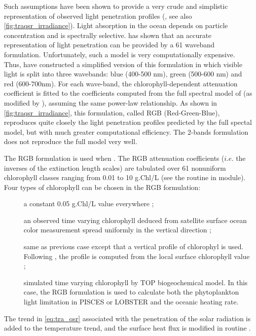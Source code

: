 \documentclass[../tex_main/NEMO_manual]{subfiles}
\begin{document}
Such assumptions have been shown to provide a very crude and simplistic 
representation of observed light penetration profiles (\cite{Morel_JGR88}, see also 
\autoref{fig:traqsr_irradiance}). Light absorption in the ocean depends on 
particle concentration and is spectrally selective. \cite{Morel_JGR88} has shown 
that an accurate representation of light penetration can be provided by a 61 waveband 
formulation. Unfortunately, such a model is very computationally expensive. 
Thus, \cite{Lengaigne_al_CD07} have constructed a simplified version of this 
formulation in which visible light is split into three wavebands: blue (400-500 nm), 
green (500-600 nm) and red (600-700nm). For each wave-band, the chlorophyll-dependent 
attenuation coefficient is fitted to the coefficients computed from the full spectral model 
of \cite{Morel_JGR88} (as modified by \cite{Morel_Maritorena_JGR01}), assuming 
the same power-law relationship. As shown in \autoref{fig:traqsr_irradiance}, 
this formulation, called RGB (Red-Green-Blue), reproduces quite closely 
the light penetration profiles predicted by the full spectal model, but with much greater 
computational efficiency. The 2-bands formulation does not reproduce the full model very well. 

The RGB formulation is used when . The RGB attenuation coefficients
($i.e.$ the inverses of the extinction length scales) are tabulated over 61 nonuniform 
chlorophyll classes ranging from 0.01 to 10 g.Chl/L (see the routine  
in  module). Four types of chlorophyll can be chosen in the RGB formulation:
\begin{description} 
\item[] 
a constant 0.05 g.Chl/L value everywhere ; 
\item[]  
an observed time varying chlorophyll deduced from satellite surface ocean color measurement 
spread uniformly in the vertical direction ; 
\item[]  
same as previous case except that a vertical profile of chlorophyl is used. 
Following \cite{Morel_Berthon_LO89}, the profile is computed from the local surface chlorophyll value ;
\item[]  
simulated time varying chlorophyll by TOP biogeochemical model. 
In this case, the RGB formulation is used to calculate both the phytoplankton 
light limitation in PISCES or LOBSTER and the oceanic heating rate. 
\end{description} 
The trend in \autoref{eq:tra_qsr} associated with the penetration of the solar radiation 
is added to the temperature trend, and the surface heat flux is modified in routine . 
\end{document}
